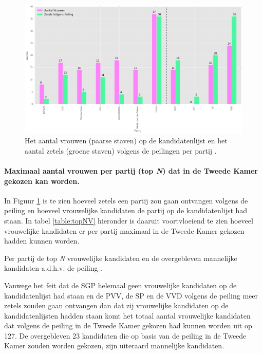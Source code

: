 \begin{figure}[H]

	\includegraphics[width=\linewidth]	{Aantal_vrouwen_aantal_zetels1.png}

			\caption{Het aantal vrouwen (paarse staven) op de kandidatenlijst \citep{Kiesraad_kandidatenlijsten} en het aantal zetels (groene staven) volgens de peilingen per partij \citep{IPSOS}.}

	\label{fig:zetelsV}
\end{figure}

\paragraph{Maximaal aantal vrouwen per partij (top \textit{N}) dat in de Tweede Kamer gekozen kan worden.}
In Figuur \ref{fig:zetelsV} is te zien hoeveel zetels een partij zou gaan ontvangen volgens de peiling en hoeveel vrouwelijke kandidaten de partij op de kandidatenlijst had staan. In tabel \ref{table:topNV} hieronder is daaruit voortvloeiend te zien hoeveel vrouwelijke kandidaten er per partij maximaal in de Tweede Kamer gekozen hadden kunnen worden.  


\begin{table}[h]
\centering
	\begin{footnotesize}
		
	\end{footnotesize}
			\caption{Per partij de top \textit{N} vrouwelijke kandidaten en de overgebleven mannelijke kandidaten a.d.h.v. de peiling \citep{IPSOS}.}
\label{table:topNV} 
\end{table}

Vanwege het feit dat de SGP helemaal geen vrouwelijke kandidaten op de kandidatenlijst had staan en de PVV, de SP en de VVD volgens de peiling meer zetels zouden gaan ontvangen dan dat zij vrouwelijke kandidaten op de kandidatenlijsten hadden staan komt het totaal aantal vrouwelijke kandidaten dat volgens de peiling in de Tweede Kamer gekozen had kunnen worden uit op 127. De overgebleven 23 kandidaten die op basis van de peiling in de Tweede Kamer zouden worden gekozen, zijn uiteraard mannelijke kandidaten.


